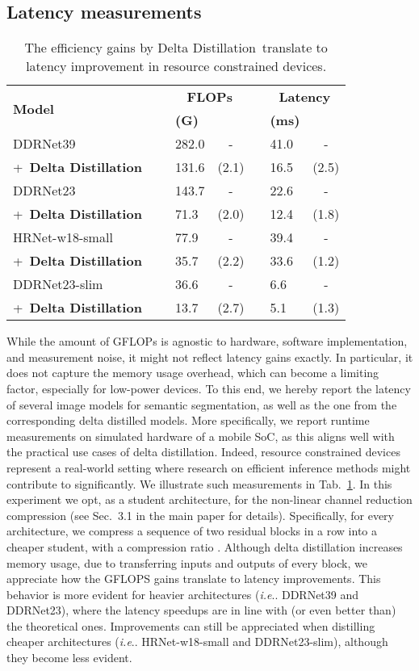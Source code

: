 \documentclass[runningheads]{llncs}
\makeatletter
\newcommand{\deltadist}{Delta Distillation~}
\DeclareRobustCommand\onedot{\futurelet\@let@token\@onedot}
\def\@onedot{\ifx\@let@token.\else.\null\fi\xspace}
\def\ie{\emph{i.e}\onedot} \def\Ie{\emph{I.e}\onedot}
\makeatother
\begin{document}
\subsection{Latency measurements}
\begin{table}[t]
\caption{The efficiency gains by \deltadist translate to latency improvement in resource constrained devices.}
\begin{center}
\begin{tabular}{lm{.5cm}m{1cm}cm{.5cm}m{1cm}c}
\toprule
\multirow{2}{*}{\textbf{Model}} && \multicolumn{2}{c}{\textbf{FLOPs}} && \multicolumn{2}{c}{\textbf{Latency}}\\
&& \textbf{(G)} &  && \textbf{(ms)} & \\
\midrule
\rowcolor{Gray}
DDRNet39 && 282.0 & - && 41.0 & -\\
\quad+~\textbf{\deltadist} && 131.6 & (2.1) && 16.5 & (2.5)\\ 
\rowcolor{Gray}
DDRNet23 && 143.7 & - && 22.6 & -\\
\quad+~\textbf{\deltadist} && 71.3 & (2.0) && 12.4 & (1.8)\\ 
\rowcolor{Gray}
HRNet-w18-small && 77.9 & - && 39.4 & -\\
\quad+~\textbf{\deltadist} && 35.7 & (2.2) && 33.6 & (1.2)\\ 
\rowcolor{Gray}
DDRNet23-slim && 36.6 & - && 6.6 & -\\
\quad+~\textbf{\deltadist} && 13.7 & (2.7) && 5.1 & (1.3)\\ 
\bottomrule
\end{tabular}\end{center}
\label{tab:latency} 
\end{table} While the amount of GFLOPs is agnostic to hardware, software implementation, and measurement noise, it might not reflect latency gains exactly. 
In particular, it does not capture the memory usage overhead, which can become a limiting factor, especially for low-power devices.
To this end, we hereby report the latency of several image models for semantic segmentation, as well as the one from the corresponding delta distilled models.
More specifically, we report runtime measurements on simulated hardware of a mobile SoC, as this aligns well with the practical use cases of delta distillation. 
Indeed, resource constrained devices represent a real-world setting where research on efficient inference methods might contribute to significantly.
We illustrate such measurements in Tab.~\ref{tab:latency}.
In this experiment we opt, as a student architecture, for the non-linear channel reduction compression (see Sec.~3.1 in the main paper for details).
Specifically, for every architecture, we compress a sequence of two residual blocks in a row into a cheaper student, with a compression ratio .
Although delta distillation increases memory usage, due to transferring inputs and outputs of every block, we appreciate how the GFLOPS gains translate to latency improvements.
This behavior is more evident for heavier architectures (\ie DDRNet39 and DDRNet23), where the latency speedups are in line with (or even better than) the theoretical ones.
Improvements can still be appreciated when distilling cheaper architectures (\ie HRNet-w18-small and DDRNet23-slim), although they become less evident. 
\end{document}

